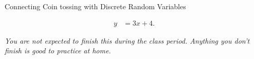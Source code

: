 


\begin{problem}
\item Connecting Coin tossing with Discrete Random Variables

  \begin{subproblem}
  \item 
    \begin{eqnarray}
      y & = 3x + 4.
    \end{eqnarray}
    \vfill
  \end{subproblem}


\end{problem}



\textit{You are not expected to finish this during the class
  period. Anything you don't finish is good to practice at home.}

